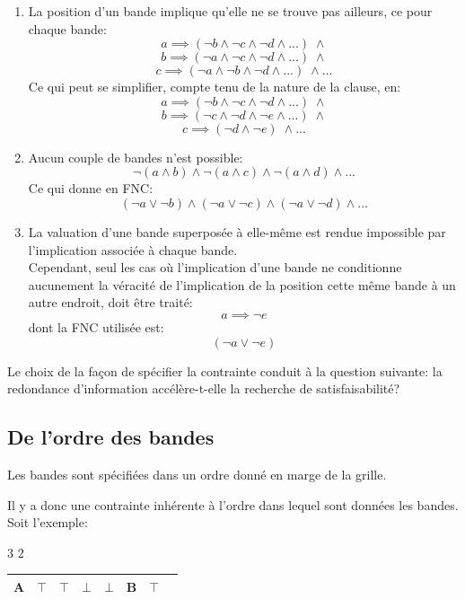 \documentclass[a4paper,12pt]{report}
\newcommand\black{\cellcolor{black}}
\begin{document}
\begin{enumerate}
\item La position d'un bande implique qu'elle ne se trouve pas ailleurs, ce pour chaque bande:
$$a \implies (\lnot b \wedge \lnot c \wedge \lnot d \wedge ... )\; \wedge$$
$$b \implies (\lnot a \wedge \lnot c \wedge \lnot d \wedge ... )\; \wedge$$
$$c \implies (\lnot a \wedge \lnot b \wedge \lnot d \wedge ... )\; \wedge ...$$
Ce qui peut se simplifier, compte tenu de la nature de la clause, en:
$$a \implies (\lnot b \wedge \lnot c \wedge \lnot d \wedge ... )\; \wedge$$
$$b \implies (\lnot c \wedge \lnot d \wedge \lnot e \wedge ... )\; \wedge$$
$$c \implies (\lnot d \wedge \lnot e)\; \wedge ...$$

\item Aucun couple de bandes n'est possible:
$$\lnot(a \wedge b) \wedge \lnot(a \wedge c) \wedge \lnot(a \wedge d) \wedge ...  $$
Ce qui donne en FNC: 
$$(\lnot a \vee \lnot b) \wedge (\lnot a \vee \lnot c) \wedge (\lnot a \vee \lnot d) \wedge ...$$

\item La valuation d'une bande superposée à elle-même est rendue impossible par l'implication associée à chaque bande.\\
Cependant, seul les cas où l'implication d'une bande ne conditionne aucunement la véracité de l'implication de la position cette même bande à un autre endroit, doit être traité: \\
$$a \implies \lnot e$$
dont la FNC utilisée est:		
$$(\lnot a \vee \lnot e)$$
\end{enumerate}

Le choix de la façon de spécifier la contrainte conduit à la question suivante: la redondance d'information accélère-t-elle la recherche de satisfaisabilité? 

\subsection{De l'ordre des bandes}

Les bandes sont spécifiées dans un ordre donné en marge de la grille. 

Il y a donc une contrainte inhérente à l'ordre dans lequel sont données les bandes.\\

Soit l'exemple: 
\begin{center}
3 2 
\begin{tabular}{|c|c|c|c|c|c|c|c|}
\hline
	\black \color{white} A & \black \color{white}$\top$  & \black \color{white}$\top$  
	& $\bot$ & 	
	$\bot$ & \black \color{white}B  & \black \color{white}$\top$  \\ 			
	\hline
\end{tabular}
\end{center}
\end{document}
